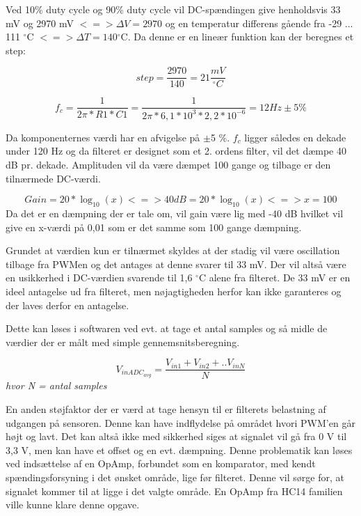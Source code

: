 Ved 10\% duty cycle og 90\% duty cycle vil DC-spændingen give henholdsvis 33 mV og 2970 mV $<=> \Delta V = 2970$ og en temperatur differens gående fra -29 ... 111 ${^{\circ}}$C $<=> \Delta T = 140 {^{\circ}}$C. Da denne er en lineær funktion kan der beregnes et step:

\begin{equation}
step = \frac{2970}{140} = 21 \frac{mV}{^{\circ}C}
\end{equation}


\begin{equation}
f_c = \frac{1}{2 \pi * R1 * C1} = \frac{1}{2 \pi * 6,1*10^3  * 2,2*10^{-6}} = 12 Hz\pm5 \%
\end{equation}

Da komponenternes værdi har en afvigelse på $\pm$5 \%.
$f_c$ ligger således en dekade under 120 Hz og da filteret er designet som et 2. ordens filter, vil det dæmpe 40 dB pr. dekade. Amplituden vil da være dæmpet 100 gange og tilbage er den tilnærmede DC-værdi. 

\begin{equation}
Gain = 20 * \log_{10}(x) <=> 40 dB = 20 * \log_ {10}(x) <=> x = 100
\end{equation} 
Da det er en dæmpning der er tale om, vil gain være lig med -40 dB hvilket vil give en x-værdi på 0,01 som er det samme som 100 gange dæmpning.

Grundet at værdien kun er tilnærmet skyldes at der stadig vil være oscillation tilbage fra PWMen og det antages at denne svarer til 33 mV. Der vil altså være en usikkerhed i DC-værdien svarende til 1,6 $^{\circ}$C alene fra filteret. De 33 mV er en ideel antagelse ud fra filteret, men nøjagtigheden herfor kan ikke garanteres og der laves derfor en antagelse.

Dette kan løses i softwaren ved evt. at tage et antal samples og så midle de værdier der er målt med simple gennemsnitsberegning. 

\begin{equation}
V_{inADC_{avg}} = \frac{V_{in1} + V_{in2} + .. V_{inN}}{N}
\end{equation} 
\textit{hvor N = antal samples}

En anden støjfaktor der er værd at tage hensyn til er filterets belastning af udgangen på sensoren. Denne kan have indflydelse på området hvori PWM'en går højt og lavt. Det kan altså ikke med sikkerhed siges at signalet vil gå fra 0 V til 3,3 V, men kan have et offset og en evt. dæmpning. Denne problematik kan løses ved indsættelse af en OpAmp, forbundet som en komparator, med kendt spændingsforsyning i det ønsket område, lige før filteret. Denne vil sørge for, at signalet kommer til at ligge i det valgte område. En OpAmp fra HC14 familien ville kunne klare denne opgave. 

